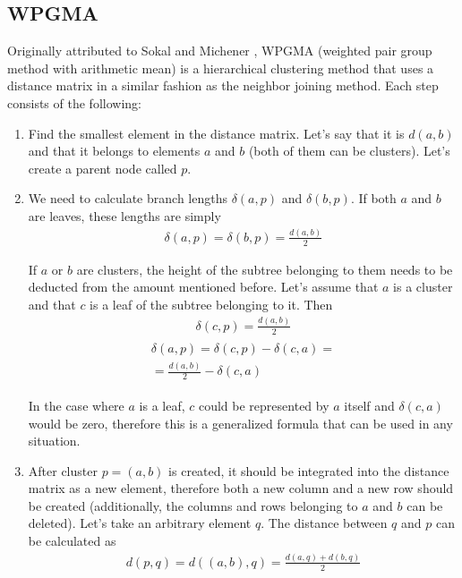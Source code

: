 \documentclass[11pt,twocolumn]{article}
\begin{document}
\subsection{WPGMA}

Originally attributed to Sokal and Michener \cite{sokal58}, WPGMA (weighted pair group method with arithmetic mean) is a hierarchical clustering method that uses a distance matrix in a similar fashion as the neighbor joining method. Each step consists of the following:

\begin{enumerate}
\item Find the smallest element in the distance matrix. Let's say that it is $d(a, b)$ and that it belongs to elements $a$ and $b$ (both of them can be clusters). Let's create a parent node called $p$.

\item We need to calculate branch lengths $\delta(a, p)$ and $\delta(b, p)$. If both $a$ and $b$ are leaves, these lengths are simply
\begin{align}
\delta(a, p) = \delta(b, p) = \frac{d(a, b)}{2}
\end{align}

If $a$ or $b$ are clusters, the height of the subtree belonging to them needs to be deducted from the amount mentioned before. Let's assume that $a$ is a cluster and that $c$ is a leaf of the subtree belonging to it. Then
\begin{align}
\delta(c, p) = \frac{d(a, b)}{2}
\end{align}
\begin{align}
\begin{split}
\delta(a, p) = \delta(c, p) - \delta(c, a) = \\
= \frac{d(a, b)}{2} - \delta(c, a)
\end{split}
\end{align}

In the case where $a$ is a leaf, $c$ could be represented by $a$ itself and $\delta(c, a)$ would be zero, therefore this is a generalized formula that can be used in any situation.

\item After cluster $p = (a, b)$ is created, it should be integrated into the distance matrix as a new element, therefore both a new column and a new row should be created (additionally, the columns and rows belonging to $a$ and $b$ can be deleted). Let's take an arbitrary element $q$. The distance between $q$ and $p$ can be calculated as
\begin{align}
d(p, q) = d((a, b), q) = \frac{d(a, q) + d(b, q)}{2}
\end{align}

\end{enumerate}
\end{document}
